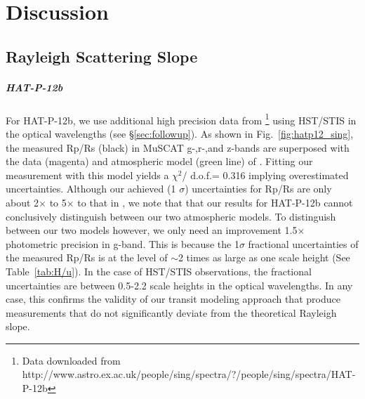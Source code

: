 \chapter{Discussion}\label{sec:discussion}
\section{Rayleigh Scattering Slope}
\paragraph{HAT-P-12b}
For HAT-P-12b, we use additional high precision data from \cite{Sing2016}\footnote{Data downloaded from http://www.astro.ex.ac.uk/people/sing/spectra/?/people/sing/spectra/HAT-P-12b} using HST/STIS in the optical wavelengths (see \S \ref{sec:followup}). As shown in Fig.~\ref{fig:hatp12_sing}, the measured Rp/Rs (black) in MuSCAT g-,r-,and z-bands are superposed with the data (magenta) and atmospheric model (green line) of \cite{Sing2016}. Fitting our measurement with this model yields a $\chi^2$/ d.o.f.= 0.316 implying overestimated uncertainties. %
Although our achieved (1 $\sigma$) uncertainties for Rp/Rs are only about 2$\times$ to 5$\times$ to that in \cite{Sing2016}, we note that that our results for HAT-P-12b cannot conclusively distinguish between our two atmospheric models. To distinguish between our two models however, we only need an improvement 1.5$\times$ photometric precision in g-band.
This is because the 1$\sigma$ fractional uncertainties of the measured Rp/Rs is at the level of $\sim$2 times as large as one scale height (See Table~\ref{tab:H/u}). In the case of HST/STIS observations, the fractional uncertainties %
are between 0.5-2.2 scale heights in the optical wavelengths.
In any case, this confirms the validity of our transit modeling approach that %
produce measurements that do not significantly deviate from the theoretical Rayleigh slope.


